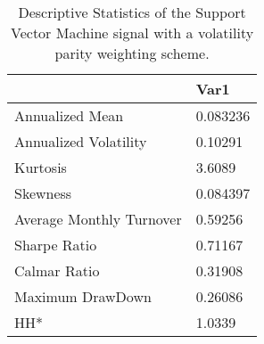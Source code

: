 \begin{table}[H]
\centering
\begin{tabular}{ll}
\hline& Var1 \\ 
\hline 
Annualized Mean & 0.083236 \\ 
Annualized Volatility & 0.10291 \\ 
Kurtosis & 3.6089 \\ 
Skewness & 0.084397 \\ 
Average Monthly Turnover & 0.59256 \\ 
Sharpe Ratio & 0.71167 \\ 
Calmar Ratio & 0.31908 \\ 
Maximum DrawDown & 0.26086 \\ 
HH* & 1.0339 \\ 
\hline
\end{tabular}
\caption{Descriptive Statistics of the Support Vector Machine signal with a volatility parity weighting scheme.}
\label{SVM_MODEL}
\end{table}